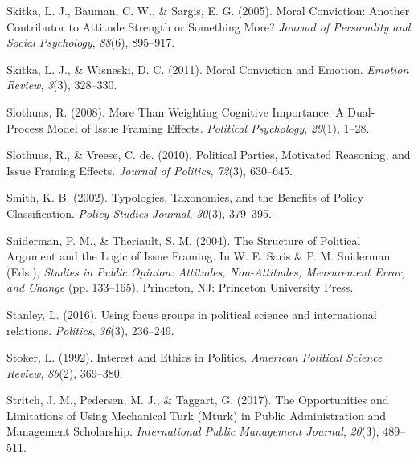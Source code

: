\documentclass[12pt,econ]{sources/authesis}
\newenvironment{CSLReferences}%
  {}%
  {\par}
\begin{document}
\begin{CSLReferences}{1}{0}
\leavevmode{}%
Skitka, L. J., Bauman, C. W., \& Sargis, E. G. (2005). Moral {Conviction}: {Another} {Contributor} to {Attitude} {Strength} or {Something} {More}? \emph{Journal of Personality and Social Psychology}, \emph{88}(6), 895--917.

\leavevmode{}%
Skitka, L. J., \& Wisneski, D. C. (2011). Moral {Conviction} and {Emotion}. \emph{Emotion Review}, \emph{3}(3), 328--330.

\leavevmode{}%
Slothuus, R. (2008). More {Than} {Weighting} {Cognitive} {Importance}: {A} {Dual}-{Process} {Model} of {Issue} {Framing} {Effects}. \emph{Political Psychology}, \emph{29}(1), 1--28.

\leavevmode{}%
Slothuus, R., \& Vreese, C. de. (2010). Political {Parties}, {Motivated} {Reasoning}, and {Issue} {Framing} {Effects}. \emph{Journal of Politics}, \emph{72}(3), 630--645.

\leavevmode{}%
Smith, K. B. (2002). Typologies, {Taxonomies}, and the {Benefits} of {Policy} {Classification}. \emph{Policy Studies Journal}, \emph{30}(3), 379--395.

\leavevmode{}%
Sniderman, P. M., \& Theriault, S. M. (2004). The {Structure} of {Political} {Argument} and the {Logic} of {Issue} {Framing}. In W. E. Saris \& P. M. Sniderman (Eds.), \emph{Studies in {Public} {Opinion}: {Attitudes}, {Non}-{Attitudes}, {Measurement} {Error}, and {Change}} (pp. 133--165). Princeton, NJ: Princeton University Press.

\leavevmode{}%
Stanley, L. (2016). Using focus groups in political science and international relations. \emph{Politics}, \emph{36}(3), 236--249.

\leavevmode{}%
Stoker, L. (1992). {Interest and Ethics in Politics}. \emph{American Political Science Review}, \emph{86}(2), 369--380.

\leavevmode{}%
Stritch, J. M., Pedersen, M. J., \& Taggart, G. (2017). {The Opportunities and Limitations of Using Mechanical Turk (Mturk) in Public Administration and Management Scholarship}. \emph{International Public Management Journal}, \emph{20}(3), 489--511.


\end{CSLReferences}
\end{document}
